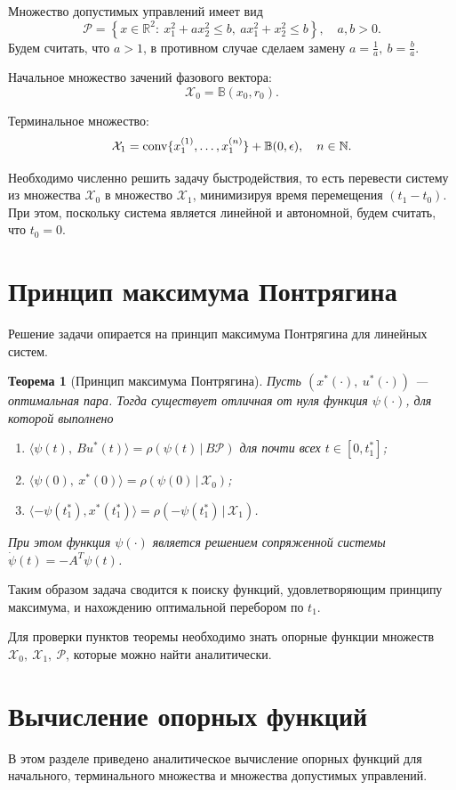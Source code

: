 \documentclass[11pt]{article}
\newtheorem{Th}{Теорема}
\newcommand\Real{\mathbb{R}}
\newcommand\PS{\mathcal{P}}
\newcommand\X{\mathcal{X}}
\newcommand\Sup[2]{\rho( #1 \, | \, #2 )}
\newcommand\Conv[1]{{\rm conv}\{ #1 \}}
\begin{document}
Множество допустимых управлений имеет вид 
$$ \PS = \left\{ x \in \Real^2 \colon \ x_1^2 + a x_2^2 \leq b, \ ax_1^2 + x_2^2 \leq b \right\}, \quad a,b > 0.$$
Будем считать, что $a > 1$, в противном случае сделаем замену $a = \frac{1}{a}, \ b = \frac{b}{a}$.

Начальное множество зачений фазового вектора: $$\X_0 = \mathbb{B}(x_0, r_0).$$

Терминальное множество: $$\X_1 = \Conv{x_1^{\left(1\right)}, \ldots, x_1^{\left(n\right)}} + \mathbb{B}(0, \epsilon), \quad n \in \mathbb{N}.$$

Необходимо численно решить задачу быстродействия, то есть перевести систему из множества $\X_0$ в множество $\X_1$,
минимизируя время перемещения $(t_1 - t_0)$. При этом, поскольку система является линейной и автономной, будем считать, что $t_0 = 0$.


\newpage
\section{Принцип максимума Понтрягина}
Решение задачи опирается на принцип максимума Понтрягина для линейных систем.

\begin{Th}[Принцип максимума Понтрягина] 
Пусть $(x^*(\cdot), \ u^*(\cdot))$ --- оптимальная пара. Тогда существует отличная от нуля функция 
$\psi(\cdot)$, для которой выполнено
\begin{enumerate}
\item $\langle \psi(t), \ Bu^*(t) \rangle = \Sup{\psi(t)}{B \PS}$ для почти всех $t \in [0, t_1^*]$; 
\item $\langle \psi(0), \ x^*(0) \rangle = \Sup{\psi(0)}{\X_0}$;
\item $\langle -\psi(t_1^*), x^*(t_1^*) \rangle = \Sup{-\psi(t_1^*)}{\X_1}$.
\end{enumerate}
При этом функция $\psi(\cdot)$ является решением сопряженной системы $\dot \psi(t) = -A^T\psi(t)$.
\end{Th}

Таким образом задача сводится к поиску функций, удовлетворяющим принципу максимума, и нахождению оптимальной перебором по $t_1$.

Для проверки пунктов теоремы необходимо знать опорные функции множеств $\X_0, \ \X_1, \ \PS$, 
которые можно найти аналитически.

\newpage
\section{Вычисление опорных функций}
В этом разделе приведено аналитическое вычисление опорных функций для начального, терминального множества и множества допустимых управлений.
\end{document}
